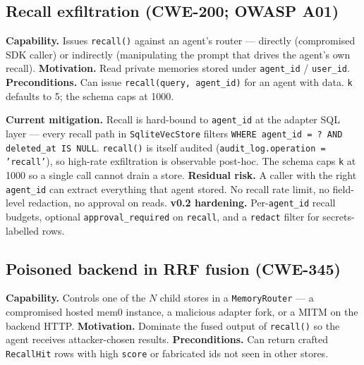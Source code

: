\documentclass[11pt,letterpaper,twocolumn]{article}
\begin{document}
\subsection{Recall exfiltration (CWE-200; OWASP A01)}
\label{sec:threats-exfiltration}

\textbf{Capability.} Issues \texttt{recall()} against an agent's router --- directly (compromised SDK caller) or indirectly (manipulating the prompt that drives the agent's own recall). \textbf{Motivation.} Read private memories stored under \texttt{agent\_id} / \texttt{user\_id}. \textbf{Preconditions.} Can issue \texttt{recall(query, agent\_id)} for an agent with data. \texttt{k} defaults to 5; the schema caps at 1000.

\textbf{Current mitigation.} Recall is hard-bound to \texttt{agent\_id} at the adapter SQL layer --- every recall path in \texttt{SqliteVecStore} filters \texttt{WHERE agent\_id = ? AND deleted\_at IS NULL}. \texttt{recall()} is itself audited (\texttt{audit\_log.operation = 'recall'}), so high-rate exfiltration is observable post-hoc. The schema caps \texttt{k} at 1000 so a single call cannot drain a store. \textbf{Residual risk.} A caller with the right \texttt{agent\_id} can extract everything that agent stored. No recall rate limit, no field-level redaction, no approval on reads. \textbf{v0.2 hardening.} Per-\texttt{agent\_id} recall budgets, optional \texttt{approval\_required} on \texttt{recall}, and a \texttt{redact} filter for secrets-labelled rows.

\subsection{Poisoned backend in RRF fusion (CWE-345)}
\label{sec:threats-poisoned}

\textbf{Capability.} Controls one of the $N$ child stores in a \texttt{MemoryRouter} --- a compromised hosted mem0 instance, a malicious adapter fork, or a MITM on the backend HTTP. \textbf{Motivation.} Dominate the fused output of \texttt{recall()} so the agent receives attacker-chosen results. \textbf{Preconditions.} Can return crafted \texttt{RecallHit} rows with high \texttt{score} or fabricated ids not seen in other stores.
\end{document}

